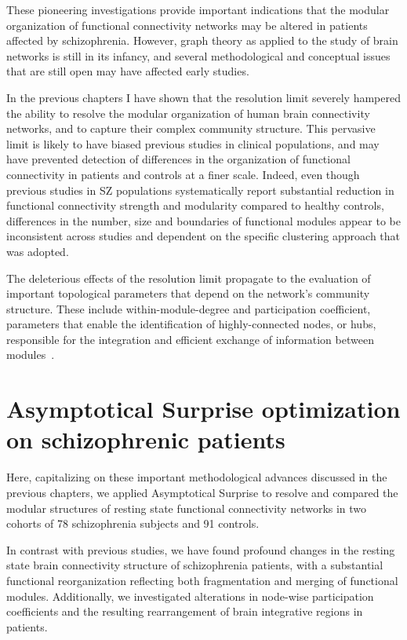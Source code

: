 These pioneering investigations provide important indications that the modular organization of functional connectivity networks may be altered in patients affected by schizophrenia.
However, graph theory as applied to the study of brain networks is still in its infancy, and several methodological and conceptual issues that are still open may have affected early studies.

In the previous chapters I have shown that the resolution limit severely hampered the ability to resolve the modular organization of human brain connectivity networks, and to capture their complex community structure.
This pervasive limit is likely to have biased previous studies in clinical populations, and may have prevented detection of differences in the organization of functional connectivity in patients and controls at a finer scale.
Indeed, even though previous studies in SZ populations systematically report substantial reduction in functional connectivity strength and modularity compared to healthy controls, differences in the number, size and boundaries of functional modules appear to be inconsistent across studies and dependent on the specific clustering approach that was adopted.

The deleterious effects of the resolution limit propagate to the evaluation of important topological parameters that depend on the network's community structure.
These include within-module-degree and participation coefficient, parameters that enable the identification of highly-connected nodes, or hubs, responsible for the integration and efficient exchange of information between modules~\cite{bullmore2009}.

\section{Asymptotical Surprise optimization on schizophrenic patients}
Here, capitalizing on these important methodological advances discussed in the previous chapters, we applied Asymptotical Surprise to resolve and compared the modular structures of resting state functional connectivity networks in two cohorts of 78 schizophrenia subjects and 91 controls.

In contrast with previous studies, we have found profound changes in the resting state brain connectivity structure of schizophrenia patients, with a substantial functional reorganization reflecting both fragmentation and merging of functional modules.
Additionally, we investigated alterations in node-wise participation coefficients and the resulting rearrangement of brain integrative regions in patients.

